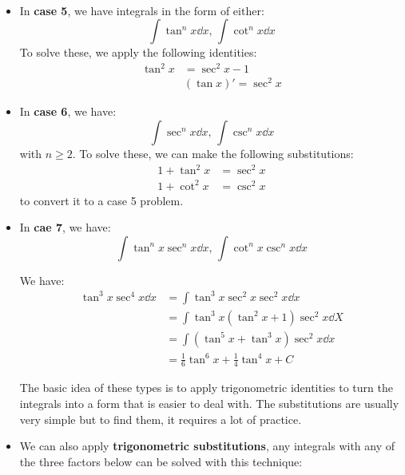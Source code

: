 \begin{itemize}
\begin{example}
\begin{align}
        \end{align}
    \end{example}
    \item In \textbf{case 5}, we have integrals in the form of either:
    \begin{equation}
        \int \tan^n x \dd{x},\, \int \cot^n x \dd{x}
    \end{equation}
    To solve these, we apply the following identities:
    \begin{align}
        \tan^2 x &= \sec^2 x - 1 \\ 
        & (\tan x)' = \sec^2 x 
    \end{align}
    \item In \textbf{case 6}, we have:
    \begin{equation}
        \int \sec^n x \dd{x},\, \int \csc^n x \dd{x}
    \end{equation}
    with $n \ge 2$. To solve these, we can make the following substitutions:
    \begin{align}
        1 + \tan^2 x &= \sec^2 x \\ 
        1 + \cot^2 x &= \csc^2 x
    \end{align}
    to convert it to a case 5 problem.
    \item In \textbf{cae 7}, we have:
    \begin{equation}
        \int \tan^n x \sec^n x\dd{x},\, \int \cot^n x\csc^n x \dd{x}
    \end{equation}
    \begin{example}
        We have:
        \begin{align}
            \tan^3 x \sec^4 x \dd{x} &= \int \tan^3 x \sec^2 x \sec^2 x \dd{x} \\ 
            &= \int \tan^3 x\left(\tan^2 x + 1\right)\sec^2 x \dd{X} \\ 
            &= \int (\tan^5 x + \tan^3 x)\sec^2 x \dd{x} \\ 
            &= \frac{1}{6}\tan^6 x + \frac{1}{4}\tan^4 x + C
        \end{align}
    \end{example}
    \begin{idea}
        The basic idea of these types is to apply trigonometric identities to turn the integrals into a form that is easier to deal with. The substitutions are usually very simple but to find them, it requires a lot of practice.
    \end{idea}
    \item We can also apply \textbf{trigonometric substitutions}, any integrals with any of the three factors below can be solved with this technique:

\end{itemize}

